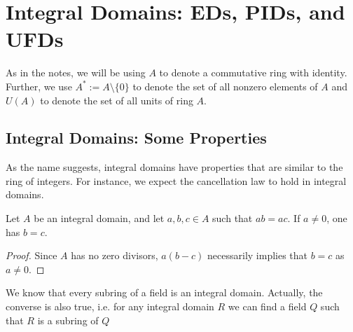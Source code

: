 \appendix
\chapter{Integral Domains: EDs, PIDs, and UFDs}
As in the notes, we will be using $A$ to denote a commutative ring with identity. Further, we use $A^{*}:= A \setminus \{0\}$ to denote the set of all nonzero elements of $A$ and $U(A)$ to denote the set of all units of ring $A$.

\section{Integral Domains: Some Properties}
As the name suggests, integral domains have properties that are similar to the ring of integers. For instance, we expect the cancellation law to hold in integral domains. 

 \begin{proposition}
     Let $A$ be an integral domain, and let $a, b, c \in A$ such that $a b=a c$. If $a \neq 0$, one has $b=c$.
 \end{proposition}
\begin{proof}
    Since $A$ has no zero divisors, $a(b-c)$ necessarily implies that $b=c$ as $a\neq 0$.
\end{proof}
We know that every subring of a field is an integral domain. Actually, the converse is also true, i.e. for any integral domain $R$ we can find a field $Q$ such that $R$ is a subring of $Q$

